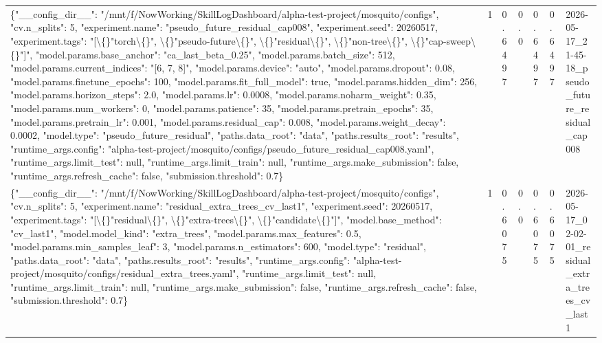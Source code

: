\begin{tabular}{lllllll}
\{"\_\_config\_dir\_\_": "/mnt/f/NowWorking/SkillLogDashboard/alpha-test-project/mosquito/configs", "cv.n\_splits": 5, "experiment.name": "pseudo\_future\_residual\_cap008", "experiment.seed": 20260517, "experiment.tags": "[\textbackslash\{\}"torch\textbackslash\{\}", \textbackslash\{\}"pseudo-future\textbackslash\{\}", \textbackslash\{\}"residual\textbackslash\{\}", \textbackslash\{\}"non-tree\textbackslash\{\}", \textbackslash\{\}"cap-sweep\textbackslash\{\}"]", "model.params.base\_anchor": "ca\_last\_beta\_0.25", "model.params.batch\_size": 512, "model.params.current\_indices": "[6, 7, 8]", "model.params.device": "auto", "model.params.dropout": 0.08, "model.params.finetune\_epochs": 100, "model.params.fit\_full\_model": true, "model.params.hidden\_dim": 256, "model.params.horizon\_steps": 2.0, "model.params.lr": 0.0008, "model.params.noharm\_weight": 0.35, "model.params.num\_workers": 0, "model.params.patience": 35, "model.params.pretrain\_epochs": 35, "model.params.pretrain\_lr": 0.001, "model.params.residual\_cap": 0.008, "model.params.weight\_decay": 0.0002, "model.type": "pseudo\_future\_residual", "paths.data\_root": "data", "paths.results\_root": "results", "runtime\_args.config": "alpha-test-project/mosquito/configs/pseudo\_future\_residual\_cap008.yaml", "runtime\_args.limit\_test": null, "runtime\_args.limit\_train": null, "runtime\_args.make\_submission": false, "runtime\_args.refresh\_cache": false, "submission.threshold": 0.7\} & 1 & 0.6497 & 0.0 & 0.6497 & 0.6497 & 2026-05-17\_21-45-18\_pseudo\_future\_residual\_cap008 \\
\{"\_\_config\_dir\_\_": "/mnt/f/NowWorking/SkillLogDashboard/alpha-test-project/mosquito/configs", "cv.n\_splits": 5, "experiment.name": "residual\_extra\_trees\_cv\_last1", "experiment.seed": 20260517, "experiment.tags": "[\textbackslash\{\}"residual\textbackslash\{\}", \textbackslash\{\}"extra-trees\textbackslash\{\}", \textbackslash\{\}"candidate\textbackslash\{\}"]", "model.base\_method": "cv\_last1", "model.model\_kind": "extra\_trees", "model.params.max\_features": 0.5, "model.params.min\_samples\_leaf": 3, "model.params.n\_estimators": 600, "model.type": "residual", "paths.data\_root": "data", "paths.results\_root": "results", "runtime\_args.config": "alpha-test-project/mosquito/configs/residual\_extra\_trees.yaml", "runtime\_args.limit\_test": null, "runtime\_args.limit\_train": null, "runtime\_args.make\_submission": false, "runtime\_args.refresh\_cache": false, "submission.threshold": 0.7\} & 1 & 0.6075 & 0.0 & 0.6075 & 0.6075 & 2026-05-17\_02-02-01\_residual\_extra\_trees\_cv\_last1 \\

\end{tabular}
